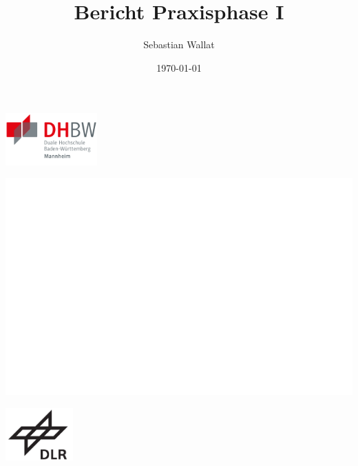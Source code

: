\documentclass[12pt,a4paper,parskip=half]{scrreprt}
\title{Bericht Praxisphase I}
\author{Sebastian Wallat}
\date{\today}
\begin{document}
	
	\begin{titlepage}
		
		\centering
		
		
		
		{%
			
			\begin{minipage}[c]{.25\textwidth}
				
				\includegraphics[width=\textwidth, height = 2cm]{dhbw-logo}
				
			\end{minipage}
			\begin{minipage}[c]{0.46\textwidth}
				
				\includegraphics[width=\textwidth]{empty}
				
			\end{minipage}
			\begin{minipage}[c]{.25\textwidth}
				
				\raggedleft
				
				\includegraphics[width=\textwidth, height =2cm, keepaspectratio]{dlr-logo}
				
			\end{minipage}
			
}
\end{titlepage}
\end{document}
